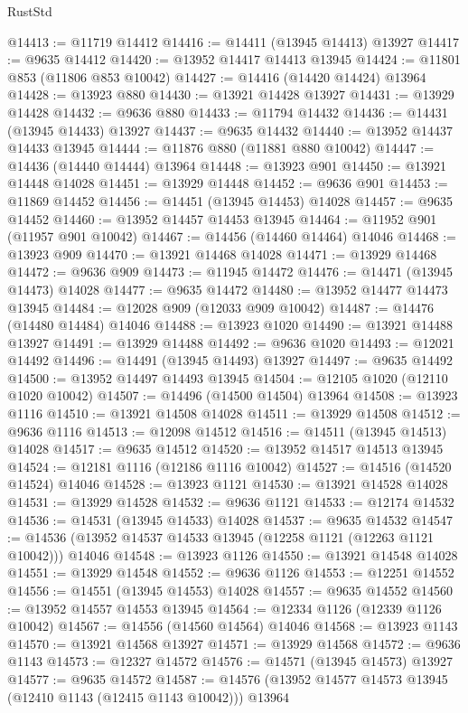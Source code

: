 \begin{lexlean}{RustStd}
\begin{coremodule}
@14413 := @11719 @14412
@14416 := @14411 (@13945 @14413) @13927
@14417 := @9635 @14412
@14420 := @13952 @14417 @14413 @13945
@14424 := @11801 @853 (@11806 @853 @10042)
@14427 := @14416 (@14420 @14424) @13964
@14428 := @13923 @880
@14430 := @13921 @14428 @13927
@14431 := @13929 @14428
@14432 := @9636 @880
@14433 := @11794 @14432
@14436 := @14431 (@13945 @14433) @13927
@14437 := @9635 @14432
@14440 := @13952 @14437 @14433 @13945
@14444 := @11876 @880 (@11881 @880 @10042)
@14447 := @14436 (@14440 @14444) @13964
@14448 := @13923 @901
@14450 := @13921 @14448 @14028
@14451 := @13929 @14448
@14452 := @9636 @901
@14453 := @11869 @14452
@14456 := @14451 (@13945 @14453) @14028
@14457 := @9635 @14452
@14460 := @13952 @14457 @14453 @13945
@14464 := @11952 @901 (@11957 @901 @10042)
@14467 := @14456 (@14460 @14464) @14046
@14468 := @13923 @909
@14470 := @13921 @14468 @14028
@14471 := @13929 @14468
@14472 := @9636 @909
@14473 := @11945 @14472
@14476 := @14471 (@13945 @14473) @14028
@14477 := @9635 @14472
@14480 := @13952 @14477 @14473 @13945
@14484 := @12028 @909 (@12033 @909 @10042)
@14487 := @14476 (@14480 @14484) @14046
@14488 := @13923 @1020
@14490 := @13921 @14488 @13927
@14491 := @13929 @14488
@14492 := @9636 @1020
@14493 := @12021 @14492
@14496 := @14491 (@13945 @14493) @13927
@14497 := @9635 @14492
@14500 := @13952 @14497 @14493 @13945
@14504 := @12105 @1020 (@12110 @1020 @10042)
@14507 := @14496 (@14500 @14504) @13964
@14508 := @13923 @1116
@14510 := @13921 @14508 @14028
@14511 := @13929 @14508
@14512 := @9636 @1116
@14513 := @12098 @14512
@14516 := @14511 (@13945 @14513) @14028
@14517 := @9635 @14512
@14520 := @13952 @14517 @14513 @13945
@14524 := @12181 @1116 (@12186 @1116 @10042)
@14527 := @14516 (@14520 @14524) @14046
@14528 := @13923 @1121
@14530 := @13921 @14528 @14028
@14531 := @13929 @14528
@14532 := @9636 @1121
@14533 := @12174 @14532
@14536 := @14531 (@13945 @14533) @14028
@14537 := @9635 @14532
@14547 := @14536 (@13952 @14537 @14533 @13945 (@12258 @1121 (@12263 @1121 @10042))) @14046
@14548 := @13923 @1126
@14550 := @13921 @14548 @14028
@14551 := @13929 @14548
@14552 := @9636 @1126
@14553 := @12251 @14552
@14556 := @14551 (@13945 @14553) @14028
@14557 := @9635 @14552
@14560 := @13952 @14557 @14553 @13945
@14564 := @12334 @1126 (@12339 @1126 @10042)
@14567 := @14556 (@14560 @14564) @14046
@14568 := @13923 @1143
@14570 := @13921 @14568 @13927
@14571 := @13929 @14568
@14572 := @9636 @1143
@14573 := @12327 @14572
@14576 := @14571 (@13945 @14573) @13927
@14577 := @9635 @14572
@14587 := @14576 (@13952 @14577 @14573 @13945 (@12410 @1143 (@12415 @1143 @10042))) @13964

\end{coremodule}
\end{lexlean}
